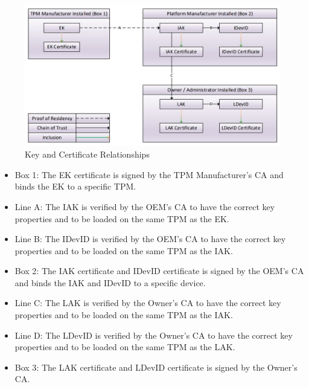 
 
\begin{figure}[h]
  \begin{centering}
  \includegraphics[width=\linewidth]{chap_3_figures/certificateRelationships.jpg}
  \par\end{centering}
  \caption{Key and Certificate Relationships \cite{DevIDSpec-TCG}}
  \label{fig:cert_rel}
\end{figure}
\begin{itemize}[itemsep=0pt,parsep=0pt,partopsep=0pt]
  \item \textsf{Box 1}: The EK certificate is signed by the TPM Manufacturer's CA and binds the EK to a specific TPM.
  \item \textsf{Line A}: The IAK is verified by the OEM's CA to have the correct key properties and to be loaded on the same TPM as the EK.
  \item \textsf{Line B}: The IDevID is verified by the OEM's CA to have the correct key properties and to be loaded on the same TPM as the IAK.
  \item \textsf{Box 2}: The IAK certificate and IDevID certificate is signed by the OEM's CA and binds the IAK and IDevID to a specific device.
  \item \textsf{Line C}: The LAK is verified by the Owner's CA to have the correct key properties and to be loaded on the same TPM as the IAK.
  \item \textsf{Line D}: The LDevID is verified by the Owner's CA to have the correct key properties and to be loaded on the same TPM as the LAK.
  \item \textsf{Box 3}: The LAK certificate and LDevID certificate is signed by the Owner's CA.
\end{itemize}

